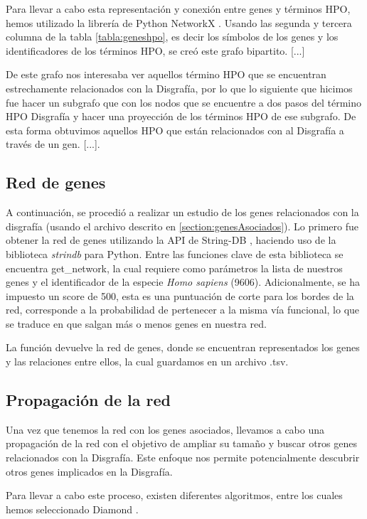 Para llevar a cabo esta representación y conexión entre genes y términos HPO, hemos utilizado la librería de Python NetworkX \cite{BookNetworkX}. Usando las segunda y tercera columna de la tabla \ref{tabla:geneshpo}, es decir los símbolos de los genes y los identificadores de los términos HPO, se creó este grafo bipartito. [...]

De este grafo nos interesaba ver aquellos término HPO que se encuentran estrechamente relacionados con la Disgrafía, por lo que lo siguiente que hicimos fue hacer un subgrafo que con los nodos que se encuentre a dos pasos del término HPO Disgrafía y hacer una proyección de los términos HPO de ese subgrafo. De esta forma obtuvimos aquellos HPO que están relacionados con al Disgrafía a través de un gen. [...].

\subsection{Red de genes}

A continuación, se procedió a realizar un estudio de los genes relacionados con la disgrafía (usando el archivo descrito en \ref{section:genesAsociados}). Lo primero fue obtener la red de genes utilizando la API de String-DB \cite{String2021}, haciendo uso de la biblioteca \textit{strindb} para Python. Entre las funciones clave de esta biblioteca se encuentra get\_network, la cual requiere como parámetros la lista de nuestros genes y el identificador de la especie \textit{Homo sapiens} (9606). Adicionalmente, se ha impuesto un score de 500, esta es una puntuación de corte para los bordes de la red, corresponde a la probabilidad de pertenecer a la misma vía funcional, lo que se traduce en que salgan más o menos genes en nuestra red.

La función devuelve la red de genes, donde se encuentran representados los genes y las relaciones entre ellos, la cual guardamos en un archivo .tsv.


\subsection{Propagación de la red}

Una vez que tenemos la red con los genes asociados, llevamos a cabo una propagación de la red con el objetivo de ampliar su tamaño y buscar otros genes relacionados con la Disgrafía. Este enfoque nos permite potencialmente descubrir otros genes implicados en la Disgrafía.

Para llevar a cabo este proceso, existen diferentes algoritmos, entre los cuales hemos seleccionado Diamond \cite{Diamond2015}.

